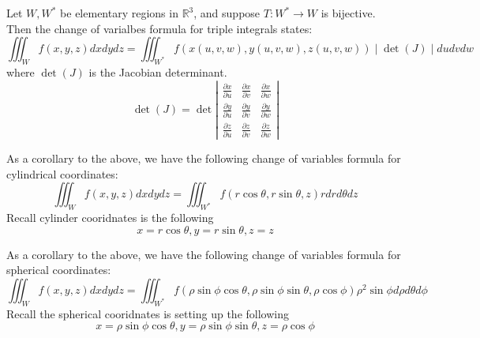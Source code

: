 \documentclass[openany]{book}
\newcommand{\R}{\mathbb{R}}
\begin{document}
\begin{prop}
    Let $W,W^*$ be elementary regions in $\R^3$, and suppose $T:W^*\to W$ is bijective. Then the change of varialbes formula for triple integrals states:
    \begin{equation*}
        \iiint_Wf(x,y,z)dxdydz=\iiint_{W^*}f(x(u,v,w), y(u,v,w), z(u,v,w))\mid\det(J)\mid dudvdw
    \end{equation*}
    where $\det(J)$ is the Jacobian determinant.
    \begin{equation*}
        \det(J)=\det\left|\begin{matrix}
            \frac{\partial x}{\partial u}&\frac{\partial x}{\partial v}&\frac{\partial x}{\partial w}\\
            \frac{\partial y}{\partial u}&\frac{\partial y}{\partial v}&\frac{\partial y}{\partial w}\\
            \frac{\partial z}{\partial u}&\frac{\partial z}{\partial v}&\frac{\partial z}{\partial w}
        \end{matrix}\right|
    \end{equation*}
\end{prop}


\begin{prop}
    As a corollary to the above, we have the following change of variables formula for cylindrical coordinates:
    \begin{equation*}
        \iiint_Wf(x,y,z)dxdydz=\iiint_{W^*}f(r\cos\theta, r\sin\theta, z)rdrd\theta dz
    \end{equation*}
    Recall cylinder cooridnates is the following 
    \begin{equation*}
        x=r\cos\theta, y=r\sin\theta, z=z
    \end{equation*}
\end{prop}

\begin{prop}
    As a corollary to the above, we have the following change of variables formula for spherical coordinates:
    \begin{equation*}
        \iiint_Wf(x,y,z)dxdydz=\iiint_{W^*}f(\rho\sin\phi\cos\theta, \rho\sin\phi\sin\theta, \rho\cos\phi)\rho^2\sin\phi d\rho d\theta d\phi
    \end{equation*}
    Recall the spherical cooridnates is setting up the following 
    \begin{equation*}
        x=\rho\sin\phi\cos\theta, y=\rho\sin\phi\sin\theta, z=\rho\cos\phi
    \end{equation*}


\end{prop}
\end{document}
